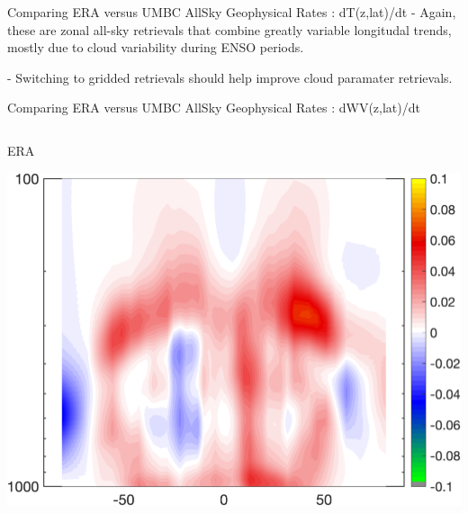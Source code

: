 \documentclass[10pt,t]{beamer}
\begin{document}
\begin{frame}{Comparing ERA versus UMBC AllSky Geophysical Rates : dT(z,lat)/dt}
-  Again, these are zonal all-sky retrievals that combine greatly variable longitudal trends, mostly due to cloud variability during ENSO periods.

- Switching to gridded retrievals should help improve cloud paramater retrievals.

\end{frame}

\begin{frame}{Comparing ERA versus UMBC AllSky Geophysical Rates : dWV(z,lat)/dt}
\vspace{-0.35in}

\begin{columns}
\begin{column}{0.55\columnwidth}
\begin{block}{\footnotesize ERA}
\vspace{-0.1in}
\begin{center}
\includegraphics[width=0.925\linewidth]{Figs/CloudAnom/Desc_ocean/ak_x_ERAwvrates.png}
\end{center}
\end{block}
\end{column}


\end{columns}
\end{frame}
\end{document}
